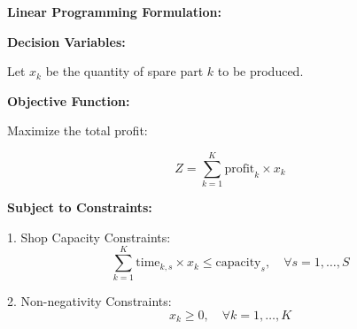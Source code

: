 \documentclass{article}
\begin{document}
\textbf{Linear Programming Formulation:}

\textbf{Decision Variables:}

Let \( x_k \) be the quantity of spare part \( k \) to be produced.

\textbf{Objective Function:}

Maximize the total profit:

\[
Z = \sum_{k=1}^{K} \text{profit}_k \times x_k
\]

\textbf{Subject to Constraints:}

1. Shop Capacity Constraints:
   \[
   \sum_{k=1}^{K} \text{time}_{k, s} \times x_k \leq \text{capacity}_s, \quad \forall s = 1, \ldots, S
   \]

2. Non-negativity Constraints:
   \[
   x_k \geq 0, \quad \forall k = 1, \ldots, K
   \]
\end{document}
